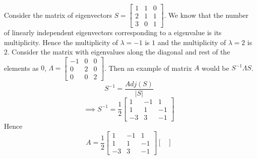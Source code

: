 \documentclass[solution,addpoints,12pt]{exam}
\newenvironment{Solution}{\begin{solution}}{\end{solution}}
\begin{document}
\begin{questions}
        \begin{Solution}
        Consider the matrix of eigenvectors $
        S = \begin{bmatrix}
            1 & 1 & 0 \\
            2 & 1 & 1 \\
            3 & 0 & 1
        \end{bmatrix}. 
        $ We know that the number of linearly independent eigenvectors corresponding to a eigenvalue is its multiplicity. Hence the multiplicity of $\lambda=-1$ is $1$ and the multiplicity of $\lambda=2$ is $2$. Consider the matrix with eigenvalues along the diagonal and rest of the elements as $0$, $ \Lambda = \begin{bmatrix}
            -1 & 0 & 0 \\
            0 & 2 & 0 \\
            0 & 0 & 2
        \end{bmatrix}
        $. Then an example of matrix $A$ would be $S^{-1} \Lambda S$.
        \[S^{-1} = \frac{Adj(S)}{|S|}\]
        \[\implies S^{-1} = \frac{1}{2}\begin{bmatrix}
            1 & -1 & 1 \\
            1 & 1 & -1 \\
            -3 & 3 & -1
        \end{bmatrix}\]
        Hence
        \[A = \frac{1}{2}\begin{bmatrix}
            1 & -1 & 1 \\
            1 & 1 & -1 \\
            -3 & 3 & -1
        \end{bmatrix} \begin{bmatrix}

\end{bmatrix}\]
\end{Solution}
\end{questions}
\end{document}
